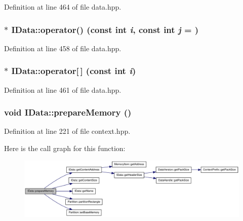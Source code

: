 Definition at line 464 of file data.hpp.\hypertarget{class_i_data_a940f8e672154c6375ea3370206a19c27}{
\subsubsection[{operator()}]{$\ast$ IData::operator() (const int {\em i}, \/  const int {\em j} = {})}}
\label{class_i_data_a940f8e672154c6375ea3370206a19c27}


Definition at line 458 of file data.hpp.\hypertarget{class_i_data_ade99450acac298c2323fa3fac89b4c8f}{
\subsubsection[{operator[]}]{$\ast$ IData::operator\mbox{[}$\,$\mbox{]} (const int {\em i})}}
\label{class_i_data_ade99450acac298c2323fa3fac89b4c8f}


Definition at line 461 of file data.hpp.\hypertarget{class_i_data_a6249481688df51d60d6e6dbf68fb69f2}{
\subsubsection[{prepareMemory}]{\setlength{\rightskip}{0pt plus 5cm}void IData::prepareMemory ()}}
\label{class_i_data_a6249481688df51d60d6e6dbf68fb69f2}


Definition at line 221 of file context.hpp.

Here is the call graph for this function:\nopagebreak
\begin{figure}[H]
\begin{center}
\leavevmode
\includegraphics[width=419pt]{class_i_data_a6249481688df51d60d6e6dbf68fb69f2_cgraph}
\end{center}
\end{figure}



